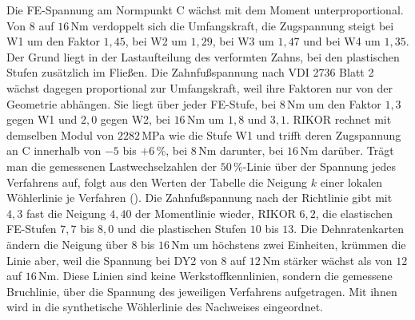 Die FE-Spannung am Normpunkt C wächst mit dem Moment unterproportional. Von $8$ auf $16$\,Nm verdoppelt sich die Umfangskraft, die Zugspannung steigt bei W1 um den Faktor $1{,}45$, bei W2 um $1{,}29$, bei W3 um $1{,}47$ und bei W4 um $1{,}35$. Der Grund liegt in der Lastaufteilung des verformten Zahns, bei den plastischen Stufen zusätzlich im Fließen. Die Zahnfußspannung nach VDI 2736 Blatt 2 wächst dagegen proportional zur Umfangskraft, weil ihre Faktoren nur von der Geometrie abhängen. Sie liegt über jeder FE-Stufe, bei $8$\,Nm um den Faktor $1{,}3$ gegen W1 und $2{,}0$ gegen W2, bei $16$\,Nm um $1{,}8$ und $3{,}1$. RIKOR rechnet mit demselben Modul von $2282$\,MPa wie die Stufe W1 und trifft deren Zugspannung an C innerhalb von $-5$ bis $+6$\,\%, bei $8$\,Nm darunter, bei $16$\,Nm darüber. Trägt man die gemessenen Lastwechselzahlen der $50$\,\%-Linie über der Spannung jedes Verfahrens auf, folgt aus den Werten der Tabelle die Neigung $k$ einer lokalen Wöhlerlinie je Verfahren (). Die Zahnfußspannung nach der Richtlinie gibt mit $4{,}3$ fast die Neigung $4{,}40$ der Momentlinie wieder, RIKOR $6{,}2$, die elastischen FE-Stufen $7{,}7$ bis $8{,}0$ und die plastischen Stufen $10$ bis $13$. Die Dehnratenkarten ändern die Neigung über $8$ bis $16$\,Nm um höchstens zwei Einheiten, krümmen die Linie aber, weil die Spannung bei DY2 von $8$ auf $12$\,Nm stärker wächst als von $12$ auf $16$\,Nm. Diese Linien sind keine Werkstoffkennlinien, sondern die gemessene Bruchlinie, über die Spannung des jeweiligen Verfahrens aufgetragen. Mit ihnen wird in  die synthetische Wöhlerlinie des Nachweises eingeordnet.

